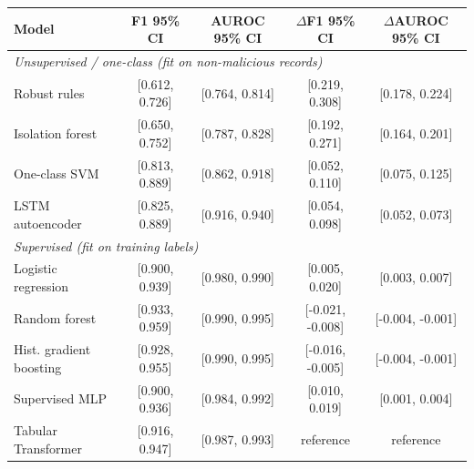 \begin{tabular}{lcccc}
\toprule
Model & F1 95\% CI & AUROC 95\% CI & $\Delta$F1 95\% CI & $\Delta$AUROC 95\% CI \\
\midrule
\multicolumn{5}{l}{\textit{Unsupervised / one-class (fit on non-malicious records)}} \\
Robust rules & [0.612, 0.726] & [0.764, 0.814] & [0.219, 0.308] & [0.178, 0.224] \\
Isolation forest & [0.650, 0.752] & [0.787, 0.828] & [0.192, 0.271] & [0.164, 0.201] \\
One-class SVM & [0.813, 0.889] & [0.862, 0.918] & [0.052, 0.110] & [0.075, 0.125] \\
LSTM autoencoder & [0.825, 0.889] & [0.916, 0.940] & [0.054, 0.098] & [0.052, 0.073] \\
\midrule
\multicolumn{5}{l}{\textit{Supervised (fit on training labels)}} \\
Logistic regression & [0.900, 0.939] & [0.980, 0.990] & [0.005, 0.020] & [0.003, 0.007] \\
Random forest & [0.933, 0.959] & [0.990, 0.995] & [-0.021, -0.008] & [-0.004, -0.001] \\
Hist. gradient boosting & [0.928, 0.955] & [0.990, 0.995] & [-0.016, -0.005] & [-0.004, -0.001] \\
Supervised MLP & [0.900, 0.936] & [0.984, 0.992] & [0.010, 0.019] & [0.001, 0.004] \\
Tabular Transformer & [0.916, 0.947] & [0.987, 0.993] & reference & reference \\
\bottomrule
\end{tabular}
